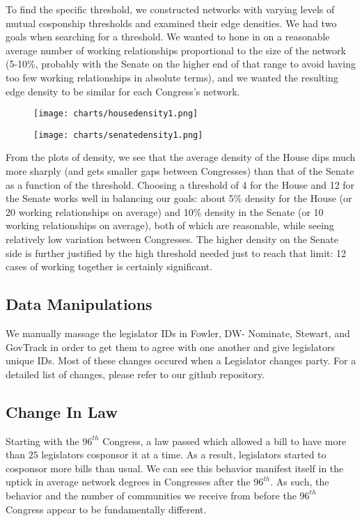To find the specific threshold, we constructed networks with varying levels of
mutual cosponship thresholds and examined their edge densities. We had two goals
when searching for a threshold. We wanted to hone in on a reasonable average
number of working relationships proportional to the size of the network (5-10\%,
probably with the Senate on the higher end of that range to avoid having too few
working relationships in absolute terms), and we wanted the resulting edge
density to be similar for each Congress's network.

\begin{figure}[h!]
    \texttt{[image: charts/housedensity1.png]}
\end{figure}

\begin{figure}[h!]
    \texttt{[image: charts/senatedensity1.png]}
\end{figure}

From the plots of density, we see that the average density of the House dips
much more sharply (and gets smaller gaps between Congresses) than that of the
Senate as a function of the threshold. Choosing a threshold of 4 for the House
and 12 for the Senate works well in balancing our goals: about 5\% density for
the House (or 20 working relationships on average) and 10\% density in the
Senate (or 10 working relationships on average), both of which are reasonable,
while seeing relatively low variation between Congresses. The higher density on
the Senate side is further justified by the high threshold needed just to reach
that limit: 12 cases of working together is certainly significant.

\subsection{Data Manipulations}

We manually massage the legislator IDs in Fowler, DW- Nominate, Stewart, and
GovTrack in order to get them to agree with one another and give legislators
unique IDs. Most of these changes occured when a Legislator changes party. For a
detailed list of changes, please refer to our github repository.

\subsection{Change In Law}

Starting with the $96^{th}$ Congress, a law passed which allowed a bill to have
more than $25$ legislators cosponsor it at a time. As a result, legislators
started to cosponsor more bills than usual. We can see this behavior manifest
itself in the uptick in average network degrees in Congresses after the
$96^{th}$. As such, the behavior and the number of communities we receive from
before the $96^{th}$ Congress appear to be fundamentally different.
